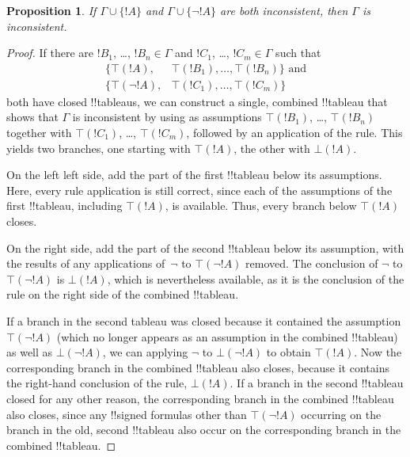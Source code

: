 \documentclass[10pt,a4paper]{article}
\theoremstyle{plain}
\newtheorem{prop}[thm]{Proposition}
\theoremstyle{definition}
\theoremstyle{remark}
\newcommand*{\ollabel}[1]{\label{#1}}
\providecommand{\sFmla}[2]{#1(#2)}
\providecommand{\True}{\top}
\providecommand{\False}{\bot}
\providecommand{\TRule}[1]{}
\providecommand{\Cut}{\mathrm{Cut}}
\begin{document}
\begin{prop}\ollabel{prop:provability-exhaustive}
  If $\Gamma \cup \{!A\}$ and $\Gamma \cup \{\lnot !A\}$ are both
  inconsistent, then $\Gamma$ is inconsistent.
\end{prop}

\begin{proof}
  If there are $!B_1$, \dots, $!B_n \in \Gamma$ and $!C_1$, \dots,
  $!C_m \in \Gamma$ such that
  \begin{align*}
    \{\sFmla{\True}{!A}, &
    \sFmla{\True}{!B_1}, \dots, \sFmla{\True}{!B_n}\} \text{ and}\\
    \{\sFmla{\True}{\lnot !A}, &
    \sFmla{\True}{!C_1}, \dots, \sFmla{\True}{!C_m}\}
  \end{align*}
  both have closed !!{tableau}s, we can construct a single, combined
  !!{tableau} that shows that $\Gamma$ is inconsistent by using as
  assumptions $\sFmla{\True}{!B_1}$, \dots, $\sFmla{\True}{!B_n}$
  together with $\sFmla{\True}{!C_1}$, \dots, $\sFmla{\True}{!C_m}$,
  followed by an application of the \Cut{} rule. This yields two
  branches, one starting with $\sFmla{\True}{!A}$, the other with
  $\sFmla{\False}{!A}$.  
  
  On the left left side, add the part of the first
  !!{tableau} below its assumptions. Here, every rule application is still
  correct, since each of the assumptions of the first !!{tableau},
  including $\sFmla{\True}{!A}$, is available. Thus, every branch
  below $\sFmla{\True}{!A}$ closes. 
  
  On the right side, add the part of the second !!{tableau} below its
  assumption, with the results of any applications
  of~$\TRule{\True}{\lnot}$ to $\sFmla{\True}{\lnot !A}$ removed.  The
  conclusion of $\TRule{\True}{\lnot}$ to $\sFmla{\True}{\lnot !A}$ is
  $\sFmla{\False}{!A}$, which is nevertheless available, as it is the
  conclusion of the \Cut{} rule on the right side of the combined !!{tableau}.

  If a branch in the second tableau was closed because it contained
  the assumption $\sFmla{\True}{\lnot !A}$ (which no longer appears as
  an assumption in the combined !!{tableau}) as well as
  $\sFmla{\False}{\lnot !A}$, we can applying $\TRule{\False}{\lnot}$
  to $\sFmla{\False}{\lnot !A}$ to obtain $\sFmla{\True}{!A}$. Now the
  corresponding branch in the combined !!{tableau} also closes,
  because it contains the right-hand conclusion of the \Cut{} rule,
  $\sFmla{\False}{!A}$. If a branch in the second !!{tableau} closed
  for any other reason, the corresponding branch in the combined
  !!{tableau} also closes, since any !!{signed formula}s other than
  $\sFmla{\True}{\lnot !A}$ occurring on the branch in the old, second
  !!{tableau} also occur on the corresponding branch in the combined
  !!{tableau}.
  \end{proof}
\end{document}
